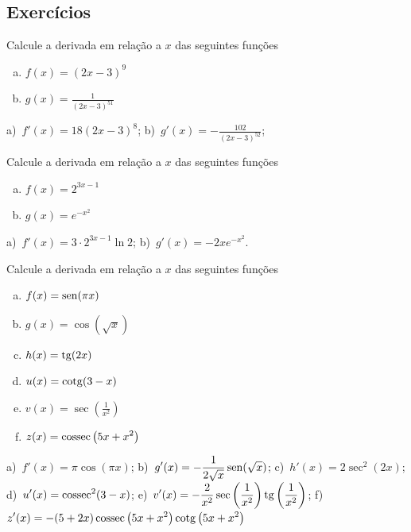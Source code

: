 \subsection*{Exercícios}

\begin{ex}
  Calcule a derivada em relação a $x$ das seguintes funções
  \begin{enumerate}[a)]
  \item $\displaystyle f(x) = (2x-3)^{9}$
  \item $\displaystyle g(x) = \frac{1}{(2x-3)^{51}}$
  \end{enumerate}
\end{ex}
\begin{resp}
  a)~$\displaystyle f'(x) = 18(2x-3)^8$; b)~$\displaystyle g'(x) = -\frac{102}{(2x-3)^{52}}$;
\end{resp}

\begin{ex}
  Calcule a derivada em relação a $x$ das seguintes funções
  \begin{enumerate}[a)]
  \item $\displaystyle f(x) = 2^{3x-1}$
  \item $\displaystyle g(x) = e^{-x^2}$
  \end{enumerate}
\end{ex}
\begin{resp}
  a)~$\displaystyle f'(x) = 3\cdot 2^{3x-1}\ln 2$; b)~$\displaystyle g'(x) = -2xe^{-x^2}$.
\end{resp}

\begin{ex}
  Calcule a derivada em relação a $x$ das seguintes funções
  \begin{enumerate}[a)]
  \item $\displaystyle f(x) = \operatorname{sen}(\pi x)$
  \item $\displaystyle g(x) = \cos(\sqrt{x})$
  \item $\displaystyle h(x) = \operatorname{tg}(2x)$
  \item $\displaystyle u(x) = \operatorname{cotg}(3 - x)$
  \item $\displaystyle v(x) = \sec\left(\frac{1}{x^2}\right)$
  \item $\displaystyle z(x) = \operatorname{cossec}\left(5x + x^2\right)$
  \end{enumerate}
\end{ex}
\begin{resp}
  a)~$\displaystyle f'(x) = \pi\cos(\pi x)$; b)~$\displaystyle g'(x) = -\frac{1}{2\sqrt{x}}\operatorname{sen}(\sqrt{x})$; c)~$\displaystyle h'(x) = 2\sec^2(2x)$; d)~$\displaystyle u'(x) = \operatorname{cossec}^2(3-x)$; e)~$\displaystyle v'(x) = -\frac{2}{x^2}\sec\left(\frac{1}{x^2}\right)\operatorname{tg}\left(\frac{1}{x^2}\right)$; f)~$\displaystyle z'(x) = -(5+2x)\operatorname{cossec}\left(5x + x^2\right)\operatorname{cotg}\left(5x + x^2\right)$
\end{resp}


